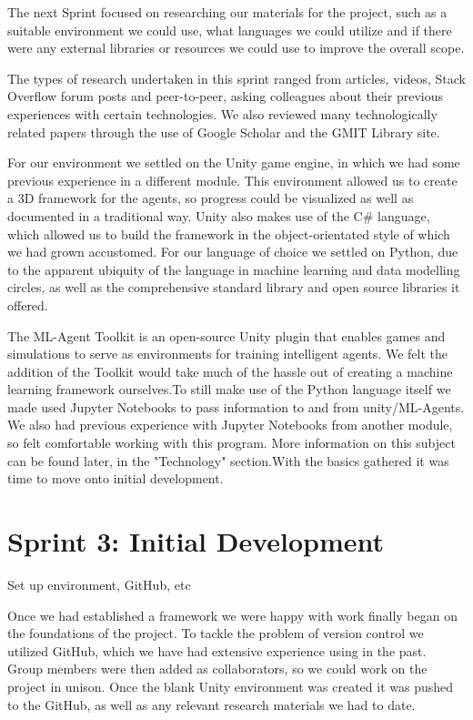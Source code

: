 	The next Sprint focused on researching our materials for the project, such as a suitable environment we could use, what languages we could utilize and if there were any external libraries or resources we could use to improve the overall scope.
	
	The types of research undertaken in this sprint ranged from articles, videos, Stack Overflow forum posts and peer-to-peer, asking colleagues about their previous experiences with certain technologies. We also reviewed many technologically related papers through the use of Google Scholar and the GMIT Library site.
	
	For our environment we settled on the Unity game engine, in which we had some previous experience in a different module. This environment allowed us to create a 3D framework for the agents, so progress could be visualized as well as documented in a traditional way. Unity also makes use of the C\# language, which allowed us to build the framework in the object-orientated style of which we had grown accustomed. For our language of choice we settled on Python, due to the apparent ubiquity of the language in machine learning and data modelling circles, as well as the comprehensive standard library and open source libraries it offered.

	The ML-Agent Toolkit is an open-source Unity plugin that enables games and simulations to serve as environments for training intelligent agents. We felt the addition of the Toolkit would take much of the hassle out of creating a machine learning framework ourselves.To still make use of the Python language itself we made used Jupyter Notebooks to pass information to and from unity/ML-Agents. We also had previous experience with Jupyter Notebooks from another module, so felt comfortable working with this program.
	More information on this subject can be found later, in the "Technology" section.With the basics gathered it was time to move onto initial development.
	

\section{Sprint 3: Initial Development}
	Set up environment, GitHub, etc
	
	Once we had established a framework we were happy with work finally began on the foundations of the project. To tackle the problem of version control we utilized GitHub, which we have had extensive experience using in the past. Group members were then added as collaborators, so we could work on the project in unison.  Once the blank Unity environment was created it was pushed to the GitHub, as well as any relevant research materials we had to date.
	
